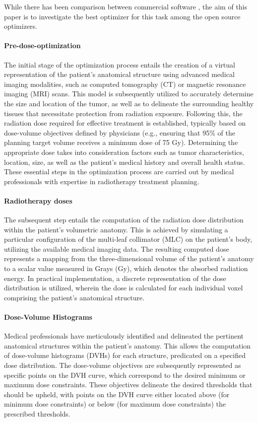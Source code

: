 \documentclass[a4paper]{article}
\begin{document}
	While there has been comparison between commercial software\cite{Tang2019} \cite{Mora-Ramirez2020}, the aim of this paper is to investigate the best optimizer for this task among the open source optimizers.
	
	\paragraph{Pre-dose-optimization}
	The initial stage of the optimization process entails the creation of a virtual representation of the patient's anatomical structure using advanced medical imaging modalities, such as computed tomography (CT) or magnetic resonance imaging (MRI) scans.
	This model is subsequently utilized to accurately determine the size and location of the tumor, as well as to delineate the surrounding healthy tissues that necessitate protection from radiation exposure.
	Following this, the radiation dose required for effective treatment is established, typically based on dose-volume objectives defined by physicians (e.g., ensuring that 95\% of the planning target volume receives a minimum dose of 75 Gy).
	Determining the appropriate dose takes into consideration factors such as tumor characteristics, location, size, as well as the patient's medical history and overall health status.
	These essential steps in the optimization process are carried out by medical professionals with expertise in radiotherapy treatment planning.
	
	\paragraph{Radiotherapy doses}
	The subsequent step entails the computation of the radiation dose distribution within the patient's volumetric anatomy.
	This is achieved by simulating a particular configuration of the multi-leaf collimator (MLC) on the patient's body, utilizing the available medical imaging data.
	The resulting computed dose represents a mapping from the three-dimensional volume of the patient's anatomy to a scalar value measured in Grays (Gy), which denotes the absorbed radiation energy.
	In practical implementation, a discrete representation of the dose distribution is utilized, wherein the dose is calculated for each individual voxel comprising the patient's anatomical structure.
	
	\paragraph{Dose-Volume Histograms}
	Medical professionals have meticulously identified and delineated the pertinent anatomical structures within the patient's anatomy.
	This allows the computation of dose-volume histograms (DVHs) for each structure, predicated on a specified dose distribution.
	The dose-volume objectives are subsequently represented as specific points on the DVH curve, which correspond to the desired minimum or maximum dose constraints.
	These objectives delineate the desired thresholds that should be upheld, with points on the DVH curve either located above (for minimum dose constraints) or below (for maximum dose constraints) the prescribed thresholds.
	
\end{document}
